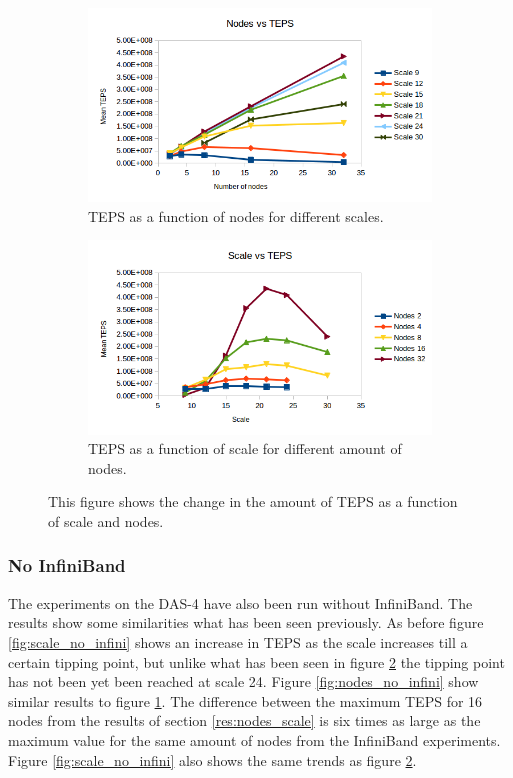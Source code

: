 \begin{figure}[!h]
\centering
\begin{subfigure}{.5\textwidth}
  \centering
  \includegraphics[width=\linewidth]{images/nodes_no_val.png}
  \caption{TEPS as a function of nodes for different scales.}
  \label{fig:nodes_no_val}
\end{subfigure}%
\begin{subfigure}{.5\textwidth}
  \centering
  \includegraphics[width=\linewidth]{images/scale_no_val.png}
  \caption{TEPS as a function of scale for different amount of nodes.}
  \label{fig:scale_no_val}
\end{subfigure}
\caption{This figure shows the change in the amount of TEPS as a function of scale and nodes.}
\label{fig:das_no_val}
\end{figure}

\subsubsection{No InfiniBand}
The experiments on the DAS-4 have also been run without InfiniBand. The results show some similarities what has been seen previously. As before figure \ref{fig:scale_no_infini} shows an increase in TEPS as the scale increases till a certain tipping point, but unlike what has been seen in figure \ref{fig:scale_no_val} the tipping point has not been yet been reached at scale 24.
 Figure \ref{fig:nodes_no_infini} show similar results to figure \ref{fig:nodes_no_val}. The difference between the maximum TEPS for 16 nodes from the results of section \ref{res:nodes_scale} is six times as large as the maximum value for the same amount of nodes from the InfiniBand experiments.
Figure \ref{fig:scale_no_infini} also shows the same trends as figure \ref{fig:scale_no_val}. 
 
